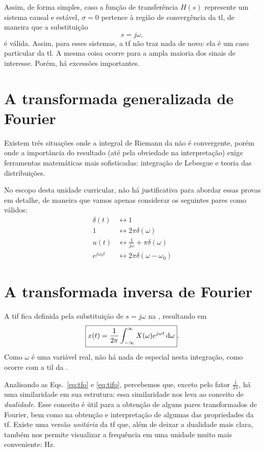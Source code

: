 Assim, de forma simples, caso a função de transferência $H(s)$ represente um sistema causal e estável, $\sigma=0$ pertence à região de convergência da \ac{tl}, de maneira que a substituição
\begin{equation}
	s=j\omega,
\end{equation}
é válida. Assim, para esses sistemas, a \ac{tf} não traz nada de novo: ela é um caso particular da \ac{tl}. A mesma coisa ocorre para a ampla maioria dos sinais de interesse. Porém, há excessões importantes.

\section{A transformada generalizada de Fourier}

Existem três situações onde a integral de Riemann da  não é convergente, porém onde a importância do resultado (até pela obviedade na interpretação) exige ferramentas matemáticas mais sofisticadas: integração de Lebesgue e teoria das distribuições.

No escopo desta unidade curricular, não há justificativa para abordar essas provas em detalhe, de maneira que vamos apenas considerar os seguintes pares como válidos:
\begin{align}
	\delta(t)&\longleftrightarrow1\\
	1&\longleftrightarrow2\pi\delta(\omega)\\
	u(t)&\longleftrightarrow\frac{1}{j\omega}+\pi\delta(\omega)\\
	e^{j\omega_0t}&\longleftrightarrow2\pi\delta(\omega-\omega_0)
\end{align}

\section{A transformada inversa de Fourier}

A \ac{tif} fica definida pela substituição de $s=j\omega$ na , resultando em
\begin{equation}\label{eq:tifo}
	\boxed{x(t)=\frac{1}{2\pi}\inte{X(\omega)e^{j\omega t}}{\omega}{-\infty}{\infty}}.
\end{equation}
Como $\omega$ é uma variável real, não há nada de especial nesta integração, como ocorre com a \ac{til} da .

Analisando as Eqs.~\eqref{eq:tfo} e \eqref{eq:tifo}, percebemos que, exceto pelo fator $\frac{1}{2\pi}$, há uma similaridade em sua estrutura: essa similaridade nos leva ao conceito de \emph{dualidade}. Esse conceito é útil para a obtenção de alguns pares transformados de Fourier, bem como na obtenção e interpretação de algumas das propriedades da \ac{tf}. Existe uma versão \emph{unitária} da \ac{tf} que, além de deixar a dualidade mais clara, também nos permite visualizar a frequência em uma unidade muito mais conveniente: \unit{\hertz}.

